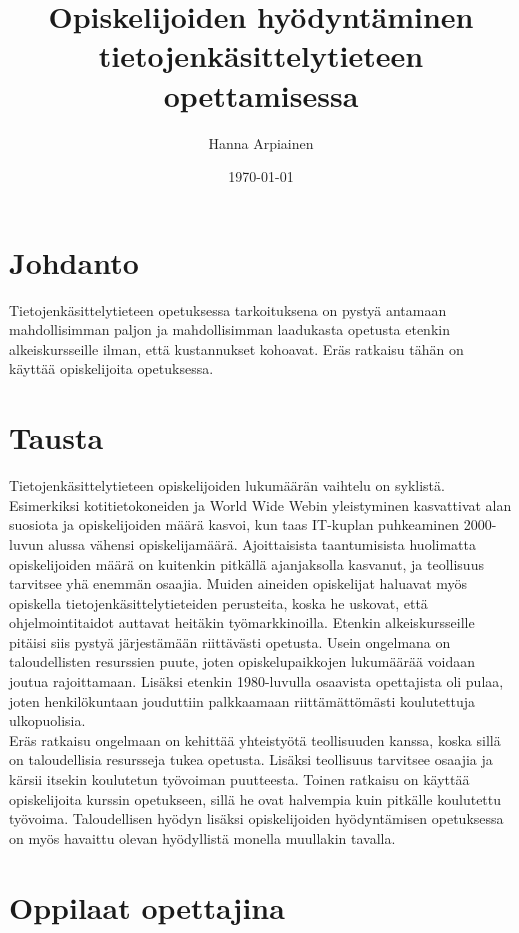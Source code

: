 \documentclass[finnish]{tktltiki2}
\title{﻿Opiskelijoiden hyödyntäminen tietojenkäsittelytieteen opettamisessa}
\author{Hanna Arpiainen}
\date{\today}
\theoremstyle{definition}
\theoremstyle{remark}
\begin{document}
\maketitle
\makeabstract

\tableofcontents
\newpage



\section{Johdanto}
Tietojenkäsittelytieteen opetuksessa tarkoituksena on pystyä antamaan mahdollisimman paljon ja mahdollisimman laadukasta opetusta etenkin alkeiskursseille ilman, että kustannukset kohoavat. Eräs ratkaisu tähän on käyttää opiskelijoita opetuksessa.



\section{Tausta}
Tietojenkäsittelytieteen opiskelijoiden lukumäärän vaihtelu on syklistä. Esimerkiksi kotitietokoneiden ja World Wide Webin yleistyminen kasvattivat alan suosiota ja opiskelijoiden määrä kasvoi, kun taas IT-kuplan puhkeaminen 2000-luvun alussa vähensi opiskelijamäärä. Ajoittaisista taantumisista huolimatta opiskelijoiden määrä on kuitenkin pitkällä ajanjaksolla kasvanut, ja teollisuus tarvitsee yhä enemmän osaajia. Muiden aineiden opiskelijat haluavat myös opiskella tietojenkäsittelytieteiden perusteita, koska he uskovat, että ohjelmointitaidot auttavat heitäkin työmarkkinoilla. Etenkin alkeiskursseille pitäisi siis pystyä järjestämään riittävästi opetusta. 
Usein ongelmana on taloudellisten resurssien puute, joten opiskelupaikkojen lukumäärää voidaan joutua rajoittamaan. Lisäksi etenkin 1980-luvulla osaavista opettajista oli pulaa, joten henkilökuntaan jouduttiin palkkaamaan riittämättömästi koulutettuja ulkopuolisia.
\\
Eräs ratkaisu ongelmaan on kehittää yhteistyötä teollisuuden kanssa, koska sillä on taloudellisia resursseja tukea opetusta. Lisäksi teollisuus tarvitsee osaajia ja kärsii itsekin koulutetun työvoiman puutteesta. Toinen ratkaisu on käyttää opiskelijoita kurssin opetukseen, sillä he ovat halvempia kuin pitkälle koulutettu työvoima. Taloudellisen hyödyn lisäksi opiskelijoiden hyödyntämisen opetuksessa on myös havaittu olevan hyödyllistä monella muullakin tavalla.\cite{Roberts11}




\section{Oppilaat opettajina}
\end{document}
